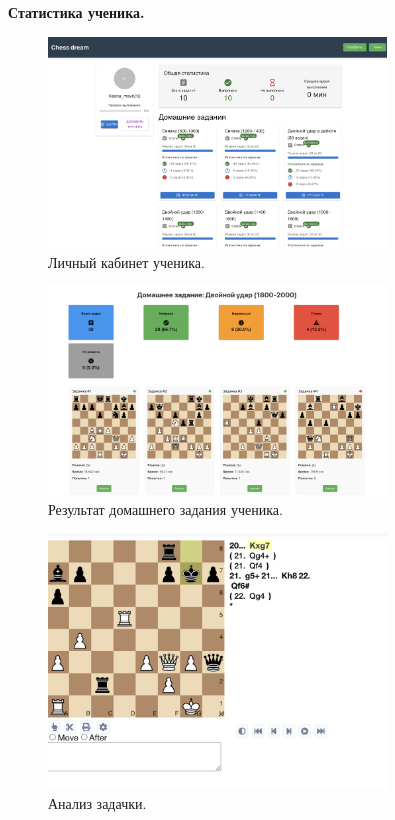 \documentclass[a4paper,12pt]{article}
\begin{document}
\noindent
\textbf{Статистика ученика.}
\begin{center}
    \begin{figure}[htbp]
    \includegraphics[width=0.8\textwidth]{chessdreampics/studentprofile.png}
    \caption{Личный кабинет ученика.}
    \end{figure}
    \begin{figure}[htbp]
    \includegraphics[width=0.8\textwidth]{chessdreampics/homeworkresult.png}
    \caption{Результат домашнего задания ученика.}
    \end{figure}
    \begin{figure}[htbp]
    \includegraphics[width=0.8\textwidth]{chessdreampics/puzzleanalysis.png}
    \caption{Анализ задачки.}
    \end{figure}
\end{center}
\vspace{0.5cm}
\end{document}
